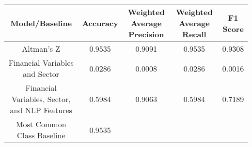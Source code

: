 \footnotesize
\begin{tabular}{ccccc}
\toprule
Model/Baseline & Accuracy & Weighted Average Precision & Weighted Average Recall & F1 Score \\
\midrule
Altman's Z & 0.9535 & 0.9091 & 0.9535 & 0.9308 \\
Financial Variables and Sector & 0.0286 & 0.0008 & 0.0286 & 0.0016 \\
Financial Variables, Sector, and NLP Features & 0.5984 & 0.9063 & 0.5984 & 0.7189 \\
Most Common Class Baseline & 0.9535 &  &  &  \\
\bottomrule
\end{tabular}

\normalsize